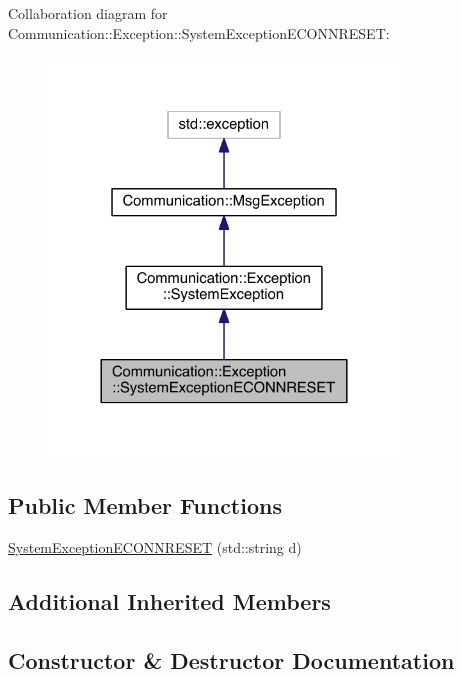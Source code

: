 Collaboration diagram for Communication\+:\+:Exception\+:\+:System\+Exception\+E\+C\+O\+N\+N\+R\+E\+S\+E\+T\+:\nopagebreak
\begin{figure}[H]
\begin{center}
\leavevmode
\includegraphics[width=264pt]{class_communication_1_1_exception_1_1_system_exception_e_c_o_n_n_r_e_s_e_t__coll__graph}
\end{center}
\end{figure}
\subsection*{Public Member Functions}
\begin{DoxyCompactItemize}
\item 
\hyperlink{class_communication_1_1_exception_1_1_system_exception_e_c_o_n_n_r_e_s_e_t_a96a4627c8465f306aad182bf82889103}{System\+Exception\+E\+C\+O\+N\+N\+R\+E\+S\+E\+T} (std\+::string d)
\end{DoxyCompactItemize}
\subsection*{Additional Inherited Members}


\subsection{Constructor \& Destructor Documentation}
\hypertarget{class_communication_1_1_exception_1_1_system_exception_e_c_o_n_n_r_e_s_e_t_a96a4627c8465f306aad182bf82889103}{}
